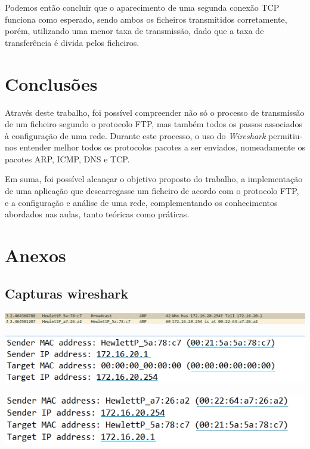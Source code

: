 \documentclass[11pt]{article}
\begin{document}
Podemos então concluir que o aparecimento de uma segunda conexão TCP funciona como esperado, sendo ambos os ficheiros transmitidos corretamente, porém, utilizando uma menor taxa de transmissão, dado que a taxa de transferência é divida pelos ficheiros.


\section{Conclusões}

Através deste trabalho, foi possível compreender não só o processo de transmissão de um ficheiro segundo o protocolo FTP, mas também todos os passos associados à configuração de uma rede. Durante este processo, o uso do \textit{Wireshark} permitiu-nos entender melhor todos os protocolos pacotes a ser enviados, nomeadamente os pacotes ARP, ICMP, DNS e TCP.

Em suma, foi possível alcançar o objetivo proposto do trabalho, a implementação de uma aplicação que descarregasse um ficheiro de acordo com o protocolo FTP, e a configuração e análise de uma rede, complementando os conhecimentos abordados nas aulas, tanto teóricas como práticas.  


\pagebreak

\section{Anexos}

\subsection{Capturas wireshark}

\bigskip

\includegraphics[width=\textwidth]{figura1.PNG}

\bigskip
\bigskip

\includegraphics[width=\textwidth]{figura2.PNG}

\bigskip
\bigskip

\includegraphics[width=\textwidth]{figura3.PNG}
\end{document}
